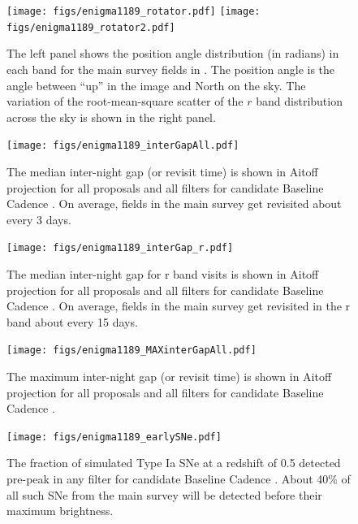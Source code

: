 \begin{figure}[b!]
\vskip -1.1in
\texttt{[image: figs/enigma1189\_rotator.pdf]}
\texttt{[image: figs/enigma1189\_rotator2.pdf]}
\vskip -1.3in
\caption{The left panel shows the position angle distribution (in radians)  in each band for the
main survey fields in . The position angle is the angle between ``up'' in the image
and North on the sky. The variation of the root-mean-square scatter of the $r$ band
distribution across the sky is shown in the right panel.}
\label{fig:rotator}
\end{figure}

\begin{figure}[t!]
\vskip -4.1in
\hskip -0.5in
\texttt{[image: figs/enigma1189\_interGapAll.pdf]}
\vskip -4.0in
\caption{The median inter-night gap (or revisit time) is shown in Aitoff projection
for all proposals and all filters for candidate Baseline Cadence .
On average, fields in the main survey get revisited about every 3 days.}
\label{fig:enigmaGapAll}
\end{figure}

\begin{figure}[h!]
\vskip -3.8in
\hskip -0.5in
\texttt{[image: figs/enigma1189\_interGap\_r.pdf]}
\vskip -4.0in
\caption{The median inter-night gap for r band visits is shown in Aitoff projection
for all proposals and all filters for candidate Baseline Cadence .
On average, fields in the main survey get revisited in the r band about every 15 days.}
\label{fig:enigmaGapr}
\end{figure}

\begin{figure}[b!]
\vskip -3.8in
\hskip -0.5in
\texttt{[image: figs/enigma1189\_MAXinterGapAll.pdf]}
\vskip -4.0in
\caption{The maximum inter-night gap (or revisit time) is shown in Aitoff projection
for all proposals and all filters for candidate Baseline Cadence .}
\label{fig:enigmaMAXGapAll}
\end{figure}

\begin{figure}[t!]
\vskip -4.1in
\hskip -0.5in
\texttt{[image: figs/enigma1189\_earlySNe.pdf]}
\vskip -4.0in
\caption{The fraction of simulated Type Ia SNe at a redshift of 0.5 detected
pre-peak in any filter for candidate Baseline Cadence . About
40\% of all such SNe from the main survey will be detected before their
maximum brightness.}
\label{fig:enigmaEarlySNe}
\end{figure}


